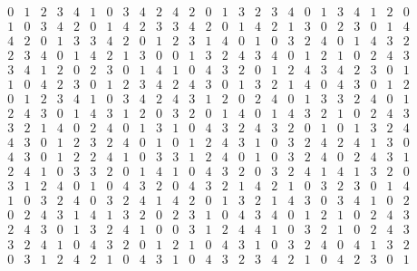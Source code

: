 \documentclass[a4paper]{article}
\begin{document}
$$\begin{array}{ccccc|ccccc|ccccc|ccccc|ccccc}
0 & 1 & 2 & 3 & 4 & 1 & 0 & 3 & 4 & 2 & 4 & 2 & 0 & 1 & 3 & 2 & 3 & 4 & 0 & 1 & 3 & 4 & 1 & 2 & 0 \\ 
1 & 0 & 3 & 4 & 2 & 0 & 1 & 4 & 2 & 3 & 3 & 4 & 2 & 0 & 1 & 4 & 2 & 1 & 3 & 0 & 2 & 3 & 0 & 1 & 4 \\ 
4 & 2 & 0 & 1 & 3 & 3 & 4 & 2 & 0 & 1 & 2 & 3 & 1 & 4 & 0 & 1 & 0 & 3 & 2 & 4 & 0 & 1 & 4 & 3 & 2 \\ 
2 & 3 & 4 & 0 & 1 & 4 & 2 & 1 & 3 & 0 & 0 & 1 & 3 & 2 & 4 & 3 & 4 & 0 & 1 & 2 & 1 & 0 & 2 & 4 & 3 \\ 
3 & 4 & 1 & 2 & 0 & 2 & 3 & 0 & 1 & 4 & 1 & 0 & 4 & 3 & 2 & 0 & 1 & 2 & 4 & 3 & 4 & 2 & 3 & 0 & 1 \\ 
\hline
1 & 0 & 4 & 2 & 3 & 0 & 1 & 2 & 3 & 4 & 2 & 4 & 3 & 0 & 1 & 3 & 2 & 1 & 4 & 0 & 4 & 3 & 0 & 1 & 2 \\ 
0 & 1 & 2 & 3 & 4 & 1 & 0 & 3 & 4 & 2 & 4 & 3 & 1 & 2 & 0 & 2 & 4 & 0 & 1 & 3 & 3 & 2 & 4 & 0 & 1 \\ 
2 & 4 & 3 & 0 & 1 & 4 & 3 & 1 & 2 & 0 & 3 & 2 & 0 & 1 & 4 & 0 & 1 & 4 & 3 & 2 & 1 & 0 & 2 & 4 & 3 \\ 
3 & 2 & 1 & 4 & 0 & 2 & 4 & 0 & 1 & 3 & 1 & 0 & 4 & 3 & 2 & 4 & 3 & 2 & 0 & 1 & 0 & 1 & 3 & 2 & 4 \\ 
4 & 3 & 0 & 1 & 2 & 3 & 2 & 4 & 0 & 1 & 0 & 1 & 2 & 4 & 3 & 1 & 0 & 3 & 2 & 4 & 2 & 4 & 1 & 3 & 0 \\ 
\hline
4 & 3 & 0 & 1 & 2 & 2 & 4 & 1 & 0 & 3 & 3 & 1 & 2 & 4 & 0 & 1 & 0 & 3 & 2 & 4 & 0 & 2 & 4 & 3 & 1 \\ 
2 & 4 & 1 & 0 & 3 & 3 & 2 & 0 & 1 & 4 & 1 & 0 & 4 & 3 & 2 & 0 & 3 & 2 & 4 & 1 & 4 & 1 & 3 & 2 & 0 \\ 
3 & 1 & 2 & 4 & 0 & 1 & 0 & 4 & 3 & 2 & 0 & 4 & 3 & 2 & 1 & 4 & 2 & 1 & 0 & 3 & 2 & 3 & 0 & 1 & 4 \\
1 & 0 & 3 & 2 & 4 & 0 & 3 & 2 & 4 & 1 & 4 & 2 & 0 & 1 & 3 & 2 & 1 & 4 & 3 & 0 & 3 & 4 & 1 & 0 & 2 \\ 
0 & 2 & 4 & 3 & 1 & 4 & 1 & 3 & 2 & 0 & 2 & 3 & 1 & 0 & 4 & 3 & 4 & 0 & 1 & 2 & 1 & 0 & 2 & 4 & 3 \\ 
\hline
2 & 4 & 3 & 0 & 1 & 3 & 2 & 4 & 1 & 0 & 0 & 3 & 1 & 2 & 4 & 4 & 1 & 0 & 3 & 2 & 1 & 0 & 2 & 4 & 3 \\ 
3 & 2 & 4 & 1 & 0 & 4 & 3 & 2 & 0 & 1 & 2 & 1 & 0 & 4 & 3 & 1 & 0 & 3 & 2 & 4 & 0 & 4 & 1 & 3 & 2 \\ 
0 & 3 & 1 & 2 & 4 & 2 & 1 & 0 & 4 & 3 & 1 & 0 & 4 & 3 & 2 & 3 & 4 & 2 & 1 & 0 & 4 & 2 & 3 & 0 & 1 \\ 

\end{array}$$
\end{document}
